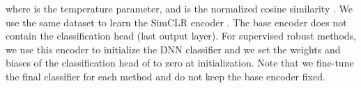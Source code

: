 \documentclass[final]{cvpr}
\begin{document}
where  is the temperature parameter, and  is the normalized cosine similarity . 
We use the same dataset  to learn the SimCLR encoder . 
The base encoder  does not contain the classification head (last output layer). For supervised robust methods, we use this encoder  to initialize the DNN classifier  and we set the weights and biases of the classification head of  to zero at initialization. 
Note that we fine-tune the final classifier  for each method and do not keep the base encoder  fixed. 



 
\begin{table*}[t]\centering
\end{table*}
\end{document}
